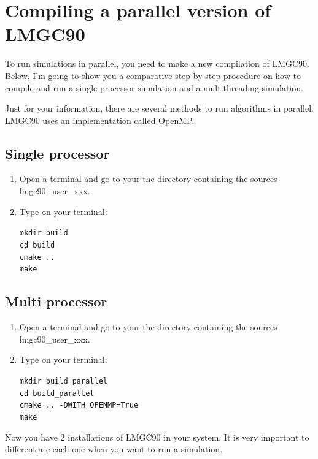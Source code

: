 \documentclass[12pt]{article}
\begin{document}
\section*{Compiling a parallel version of LMGC90}
To run simulations in parallel, you need to make a new compilation of LMGC90. Below, I’m going to show you a comparative step-by-step procedure on how to compile and run a single processor simulation and a multithreading simulation. 

Just for your information, there are several methods to run algorithms in parallel. LMGC90 uses an implementation called OpenMP.

\subsection*{Single processor}
\begin{enumerate}
  \item Open a terminal and go to your the directory containing the sources lmgc90\_user\_xxx.
  \item Type on your terminal:
  \begin{tcolorbox}
  \texttt{mkdir build} \\
  \texttt{cd build} \\
  \texttt{cmake ..} \\
  \texttt{make}
  \end{tcolorbox}
\end{enumerate}

\subsection*{Multi processor}
\begin{enumerate}
  \item Open a terminal and go to your the directory containing the sources lmgc90\_user\_xxx.
  \item Type on your terminal:
  \begin{tcolorbox}
  \texttt{mkdir build\_parallel} \\
  \texttt{cd build\_parallel} \\
  \texttt{cmake .. -DWITH\_OPENMP=True} \\
  \texttt{make}
  \end{tcolorbox}
\end{enumerate}

Now you have 2 installations of LMGC90 in your system. 
It is very important to differentiate each one when you want to run a simulation. 
\end{document}

